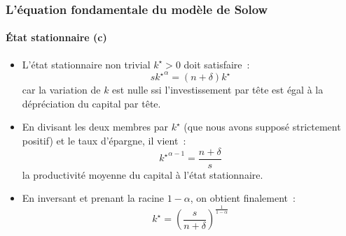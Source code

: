 \documentclass[10pt,notheorems]{beamer}
\theoremstyle{plain}
\theoremstyle{definition} %
\begin{document}
\begin{frame}
\begin{columns}
\begin{column}{0.5\textwidth}
    \end{column}
  \end{columns}

\end{frame}


\begin{frame}
  \frametitle{L'équation fondamentale du modèle de Solow}
  \framesubtitle{État stationnaire (c)}

  \bigskip

  \begin{itemize}

  \item L'état stationnaire non trivial $k^{\star}>0$ doit satisfaire~:
    \[
      s \left. k^{\star} \right.^{\alpha} = (n+\delta) k^{\star}
    \]
    car la variation de $k$ est nulle ssi l'investissement par tête
    est égal à la dépréciation du capital par tête.\newline

  \item En divisant les deux membres par $k^{\star}$ (que nous avons supposé strictement positif) et le taux d'épargne, il vient~:
    \[
      \left. k^{\star} \right.^{\alpha-1} = \frac{n+\delta}{s}
    \]
    la productivité moyenne du capital à l'état stationnaire.\newline

  \item En inversant et prenant la racine $1-\alpha$, on obtient finalement~:
    \[
      k^{\star} = \left(\frac{s}{n+\delta}\right)^{\frac{1}{1-\alpha}}
    \]
  \end{itemize}

\end{frame}
\end{document}
